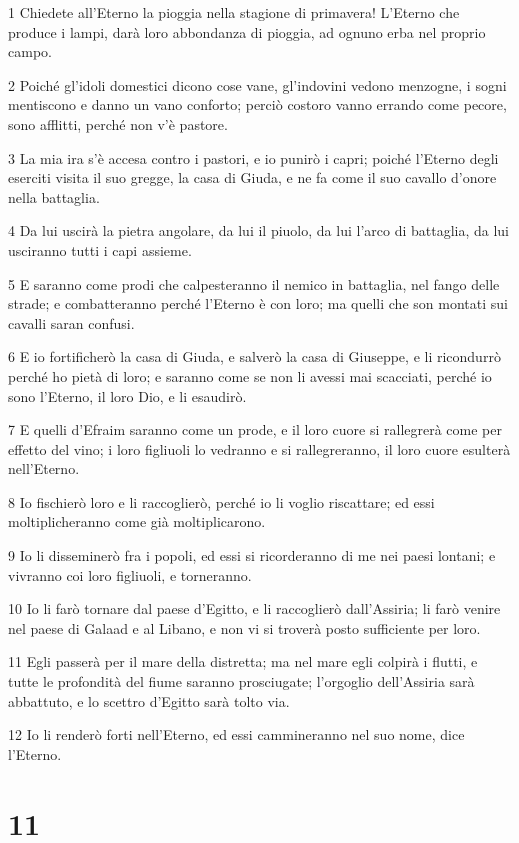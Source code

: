 \par 1 Chiedete all'Eterno la pioggia nella stagione di primavera! L'Eterno che produce i lampi, darà loro abbondanza di pioggia, ad ognuno erba nel proprio campo.
\par 2 Poiché gl'idoli domestici dicono cose vane, gl'indovini vedono menzogne, i sogni mentiscono e danno un vano conforto; perciò costoro vanno errando come pecore, sono afflitti, perché non v'è pastore.
\par 3 La mia ira s'è accesa contro i pastori, e io punirò i capri; poiché l'Eterno degli eserciti visita il suo gregge, la casa di Giuda, e ne fa come il suo cavallo d'onore nella battaglia.
\par 4 Da lui uscirà la pietra angolare, da lui il piuolo, da lui l'arco di battaglia, da lui usciranno tutti i capi assieme.
\par 5 E saranno come prodi che calpesteranno il nemico in battaglia, nel fango delle strade; e combatteranno perché l'Eterno è con loro; ma quelli che son montati sui cavalli saran confusi.
\par 6 E io fortificherò la casa di Giuda, e salverò la casa di Giuseppe, e li ricondurrò perché ho pietà di loro; e saranno come se non li avessi mai scacciati, perché io sono l'Eterno, il loro Dio, e li esaudirò.
\par 7 E quelli d'Efraim saranno come un prode, e il loro cuore si rallegrerà come per effetto del vino; i loro figliuoli lo vedranno e si rallegreranno, il loro cuore esulterà nell'Eterno.
\par 8 Io fischierò loro e li raccoglierò, perché io li voglio riscattare; ed essi moltiplicheranno come già moltiplicarono.
\par 9 Io li disseminerò fra i popoli, ed essi si ricorderanno di me nei paesi lontani; e vivranno coi loro figliuoli, e torneranno.
\par 10 Io li farò tornare dal paese d'Egitto, e li raccoglierò dall'Assiria; li farò venire nel paese di Galaad e al Libano, e non vi si troverà posto sufficiente per loro.
\par 11 Egli passerà per il mare della distretta; ma nel mare egli colpirà i flutti, e tutte le profondità del fiume saranno prosciugate; l'orgoglio dell'Assiria sarà abbattuto, e lo scettro d'Egitto sarà tolto via.
\par 12 Io li renderò forti nell'Eterno, ed essi cammineranno nel suo nome, dice l'Eterno.

\chapter{11}

